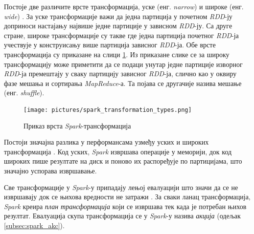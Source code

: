 \documentclass[12pt,oneside]{memoir}
\begin{document}
Постоје две различите врсте трансформација, уске (енг. \textit{narrow}) и широке (енг. \textit{wide}) \cite{spark_guide}. За уске трансформације важи да једна партиција у почетном \textit{RDD}-ју доприноси настајању највише једне партиције у зависном \textit{RDD}-ју. Са друге стране, широке трансформације су такве где једна партиција почетног \textit{RDD}-ја учествује у конструисању више партиција зависног \textit{RDD}-ја. Обе врсте трансформација су приказане на слици \ref{fig:sprk_trnsf}. Из приказане слике се за широку трансформацију може приметити да се подаци унутар једне партиције изворног \textit{RDD}-ја премештају у сваку партицију зависног \textit{RDD}-ја, слично као у оквиру фазе мешања и сортирања \textit{MapReduce}-а. Та појава се другачије назива мешање (енг. \textit{shuffle}).

\begin{figure}[!ht]
  \centering
  \texttt{[image: pictures/spark\_transformation\_types.png]}
  \caption{Приказ врста \textit{Spark}-трансформација}
  \label{fig:sprk_trnsf}
\end{figure}

Постоји значајна разлика у перформансама узмеђу уских и широких трансформација \cite{spark_guide}. Код уских, \textit{Spark} извршава операције у меморији, док код широких пише резултате на диск и поново их распоређује по партицијама, што значајно успорава извршавање.

Све трансформације у \textit{Spark}-у припадају лењој евалуацији што значи да се не извршавају док се њихова вредности не затражи \cite{spark_guide}. За сваки ланац трансформација, \textit{Spark} креира \textit{план трансформација} који се извршава тек када је потребан њихов резултат. Евалуација скупа трансформација се у \textit{Spark}-у назива \textit{акција} (одељак \ref{subsec:spark_akc}).



\end{document}
